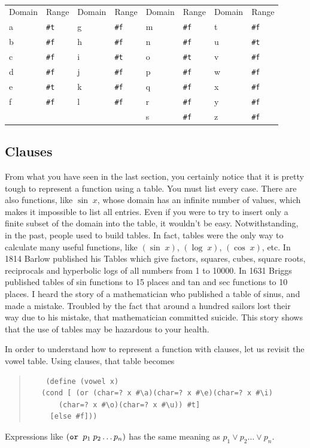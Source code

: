 \documentclass[a4paper,12pt]{book}
\begin{document}
\verb||\\
{\footnotesize
\begin{tabular}{|p{1.2cm} p{1.2cm} | p{1.2cm} p{1.2cm} |p{1.2cm} p{1.2cm} | p{1.2cm} p{1.2cm} |}
	Domain & Range & Domain & Range & Domain & Range & Domain & Range\\
	a & \verb|#t| & g &\verb|#f| & m &\verb|#f| & t & \verb|#f| \\
	b & \verb|#f| & h &\verb|#f| & n & \verb|#f| & u & \verb|#t| \\
	c & \verb|#f| &  i &\verb|#t| &o &\verb|#t| & v & \verb|#f|\\
	d &\verb|#f| &  j & \verb|#f| & p & \verb|#f| & w & \verb|#f| \\
	e &\verb|#t| & k & \verb|#f| & q & \verb|#f| & x & \verb|#f| \\
	f &\verb|#f| &  l &\verb|#f| & r & \verb|#f| & y & \verb|#f| \\
	&            &                 &  & s & \verb|#f| & z & \verb|#f|\\
\end{tabular}}

\subsection{Clauses}
From what you have seen in the last section, you certainly notice that it is pretty tough to represent a
function using a table. You must list every case. There are also functions,
like $\sin\;x$, whose domain has an infinite number of values, which makes
it impossible to list all entries. 
Even if you were to try to insert only a finite
subset of the domain into the table, it wouldn't be easy. 
Notwithstanding, in the past,
people used to build tables. In fact, tables were the only way to calculate many
useful functions, like $(\sin\;x)$, 
$(\log\;x)$, $(\cos\;x)$, etc. In 1814 Barlow
published his Tables which give factors, squares, cubes, square roots, reciprocals
and hyperbolic logs of all numbers from 1 to 10000. In 1631 Briggs published
tables of sin functions to 15 places and tan and sec functions to 10 places.
I heard the story of a mathematician who published a table of sinus, and made
a mistake. Troubled by the fact that around a hundred sailors lost their way due to his
mistake, that mathematician committed suicide. This story shows that the use
of tables may be hazardous to your health.

In order to understand how to represent a function with clauses, let us revisit the vowel table.
Using clauses, that table becomes
\begin{quote}\small
	\begin{verbatim}
	(define (vowel x)
   (cond [ (or (char=? x #\a)(char=? x #\e)(char=? x #\i) 
	   (char=? x #\o)(char=? x #\u)) #t]
	 [else #f]))
	\end{verbatim}
\end{quote}
Expressions like $(\verb|or | p_1\;p_2\ldots p_n)$ has the same 
meaning as $p_1 \vee p_2\ldots \vee p_n$.
\end{document}
